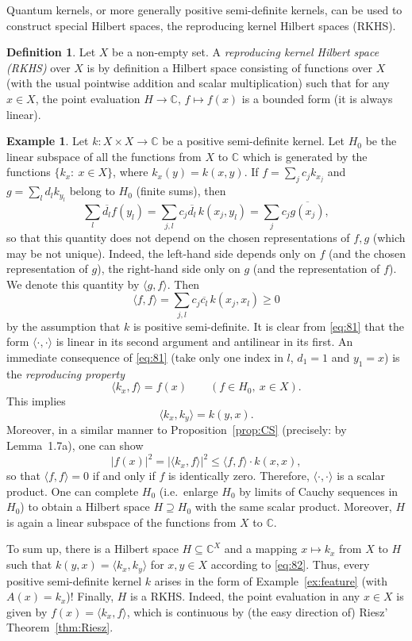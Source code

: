 \documentclass[11pt,a4paper]{article}
\numberwithin{equation}{section}
\newcommand{\C}{\mathbb{C}}
\newcommand{\ip}[2]{\langle #1, #2\rangle}
\newcommand{\conj}[1]{\overline{#1}}
\theoremstyle{plain}
\theoremstyle{definition}
\newtheorem{definition}[theorem]{Definition}
\newtheorem{example}[theorem]{Example}
\theoremstyle{plain}
\theoremstyle{definition}
\begin{document}
Quantum kernels, or more generally positive semi-definite kernels, can be used to
construct special Hilbert spaces, the reproducing kernel Hilbert spaces (RKHS).

\begin{definition}
Let $X$ be a non-empty set. A \emph{reproducing kernel Hilbert space (RKHS)} over $X$ is by
definition a Hilbert space consisting of functions over $X$ (with the usual pointwise
addition and scalar multiplication) such that for any $x\in X$, the point evaluation
$H\to\C$, $f\mapsto f(x)$ is a bounded form (it is always linear).
\end{definition}

\begin{example}\label{ex:rkhs}
Let $k:X\times X\to\C$ be a positive semi-definite kernel. Let $H_0$ be the linear subspace
of all the functions from $X$ to $\C$ which is generated by the functions
$\{k_x:\ x\in X\}$, where $k_x(y)=k(x,y)$. If $f=\sum_jc_jk_{x_j}$ and $g=\sum_ld_lk_{y_l}$
belong to $H_0$ (finite sums), then
\begin{equation}\label{eq:81}
\sum_l\conj{d_l}f(y_l)=\sum_{j,l}c_j\conj{d_l}\,k(x_j,y_l)=\sum_jc_j\conj{g(x_j)},
\end{equation}
so that this quantity does not depend on the chosen representations of $f,g$ (which may be
not unique). Indeed, the left-hand side depends only on $f$ (and the chosen representation of
$g$), the right-hand side only on $g$ (and the representation of $f$). We denote this
quantity by $\ip{g}{f}$. Then
\[
\ip ff=\sum_{j,l}c_j\conj{c_l}\,k(x_j,x_l)\ge0
\]
by the assumption that $k$ is positive semi-definite. It is clear from \eqref{eq:81} that the
form $\ip\cdot\cdot$ is linear in its second argument and antilinear in its first. An
immediate consequence of \eqref{eq:81} (take only one index in $l$, $d_1=1$ and $y_1=x$) is
the \emph{reproducing property}
\[
\ip{k_x}{f}=f(x)\qquad(f\in H_0,\ x\in X).
\]
This implies
\begin{equation}\label{eq:82}
\ip{k_x}{k_y}=k(y,x).
\end{equation}
Moreover, in a similar manner to Proposition~\ref{prop:CS} (precisely: by Lemma~1.7a), one can show
\[
|f(x)|^2=|\ip{k_x}{f}|^2\le\ip ff\cdot k(x,x),
\]
so that $\ip ff=0$ if and only if $f$ is identically zero. Therefore, $\ip\cdot\cdot$ is a
scalar product. One can complete $H_0$ (i.e.\ enlarge $H_0$ by limits of Cauchy sequences in
$H_0$) to obtain a Hilbert space $H\supseteq H_0$ with the same scalar product. Moreover,
$H$ is again a linear subspace of the functions from $X$ to $\C$.

To sum up, there is a Hilbert space $H\subseteq\C^X$ and a mapping $x\mapsto k_x$ from $X$ to
$H$ such that $k(y,x)=\ip{k_x}{k_y}$ for $x,y\in X$ according to \eqref{eq:82}. Thus, every
positive semi-definite kernel $k$ arises in the form of Example~\ref{ex:feature} (with
$A(x)=k_x$)! Finally, $H$ is a RKHS. Indeed, the point evaluation in any $x\in X$ is given by
$f(x)=\ip{k_x}{f}$, which is continuous by (the easy direction of) Riesz' Theorem~\ref{thm:Riesz}.
\end{example}
\end{document}
